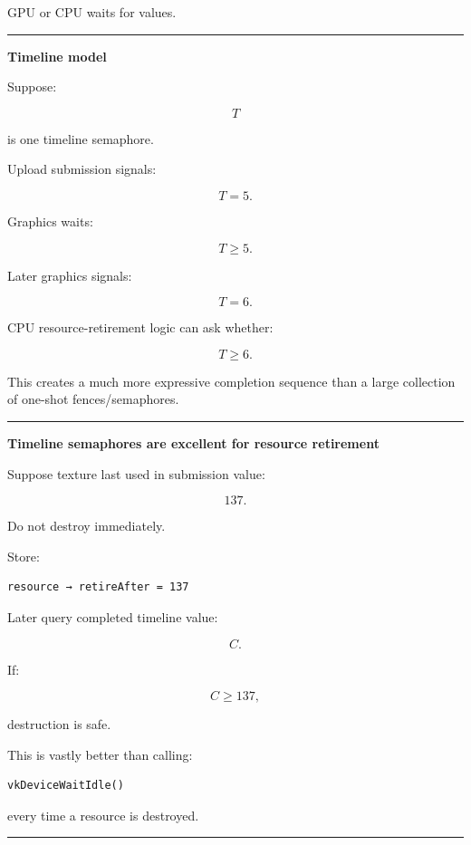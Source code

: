 GPU or CPU waits for values.

\begin{center}\rule{0.5\linewidth}{0.5pt}\end{center}

\textbf{Timeline model}

Suppose:

\[
T
\]

is one timeline semaphore.

Upload submission signals:

\[
T=5.
\]

Graphics waits:

\[
T\ge5.
\]

Later graphics signals:

\[
T=6.
\]

CPU resource-retirement logic can ask whether:

\[
T\ge6.
\]

This creates a much more expressive completion sequence than a large collection of one-shot fences/semaphores.

\begin{center}\rule{0.5\linewidth}{0.5pt}\end{center}

\textbf{Timeline semaphores are excellent for resource retirement}

Suppose texture last used in submission value:

\[
137.
\]

Do not destroy immediately.

Store:

\begin{verbatim}
resource → retireAfter = 137
\end{verbatim}

Later query completed timeline value:

\[
C.
\]

If:

\[
C\ge137,
\]

destruction is safe.

This is vastly better than calling:

\begin{verbatim}
vkDeviceWaitIdle()
\end{verbatim}

every time a resource is destroyed.

\begin{center}\rule{0.5\linewidth}{0.5pt}\end{center}

